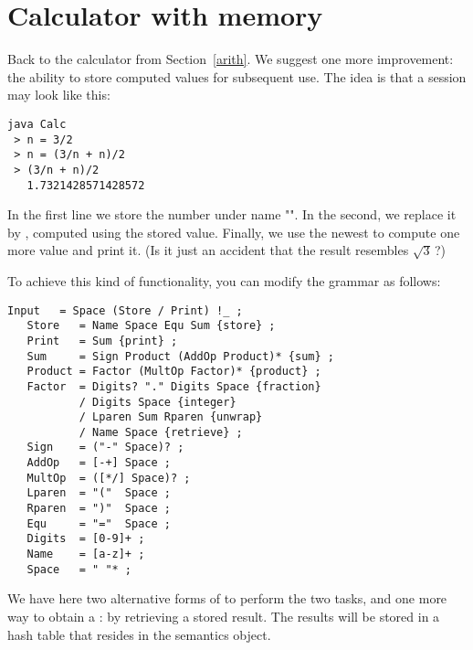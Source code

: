 
\section{Calculator with memory\label{calc}}


Back to the calculator from Section~\ref{arith}.
We suggest one more improvement:
the ability to store computed values for subsequent use.
The idea is that  
a session may look like this:

\small
\begin{Verbatim}[samepage=true,xleftmargin=15mm,baselinestretch=0.8]
 java Calc
 > n = 3/2
 > n = (3/n + n)/2
 > (3/n + n)/2
   1.7321428571428572
\end{Verbatim}
\normalsize

In the first line we store the number  under name "".
In the second, we replace it by , computed using the stored value.
Finally, we use the newest  to compute one more value and print it.
(Is it just an accident that the result resembles $\sqrt{3}$\,?)

\newpage
To achieve this kind of functionality, you can modify the grammar as follows:

\small
\begin{Verbatim}[frame=single,framesep=2mm,samepage=true,xleftmargin=15mm,xrightmargin=15mm,baselinestretch=0.8]
   Input   = Space (Store / Print) !_ ;
   Store   = Name Space Equ Sum {store} ;
   Print   = Sum {print} ;
   Sum     = Sign Product (AddOp Product)* {sum} ;
   Product = Factor (MultOp Factor)* {product} ;
   Factor  = Digits? "." Digits Space {fraction}
           / Digits Space {integer}
           / Lparen Sum Rparen {unwrap} 
           / Name Space {retrieve} ; 
   Sign    = ("-" Space)? ;
   AddOp   = [-+] Space ;
   MultOp  = ([*/] Space)? ;
   Lparen  = "("  Space ;
   Rparen  = ")"  Space ;
   Equ     = "="  Space ;
   Digits  = [0-9]+ ;
   Name    = [a-z]+ ;
   Space   = " "* ;
\end{Verbatim}
\normalsize

We have here two alternative forms of 
to perform the two tasks,
and one more way to obtain a : 
by retrieving a stored result.
The results will be stored in a hash table 
that resides in the semantics object.


